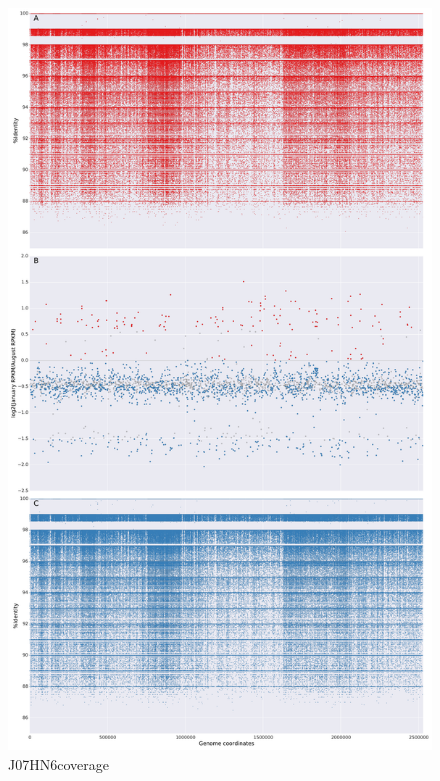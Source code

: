 \begin{figure}[!hbtp]
  \centering
  \includegraphics[width=\textwidth,height=\textheight,keepaspectratio]{Chapter5/Figures/coverage_plots/J07HN6_coverage.pdf}
  \caption{J07HN6coverage}
  \label{J07HN6coverage}
\end{figure}

